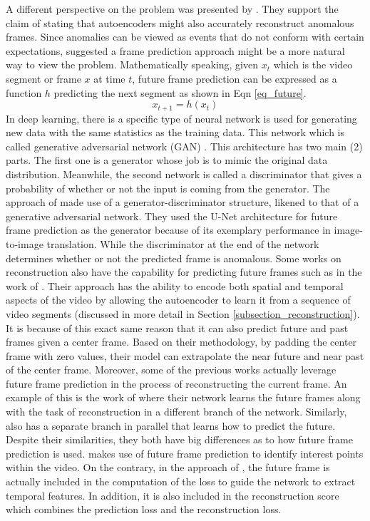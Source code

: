 A different perspective on the problem was presented by . They support the claim of   stating that autoencoders might also accurately reconstruct anomalous frames. Since anomalies can be viewed as events that do not conform with certain expectations,  suggested a frame prediction approach might be a more natural way to view the problem. Mathematically speaking, given $x_t$ which is the video segment or frame $x$ at time $t$, future frame prediction can be expressed as a function $h$ predicting the next segment as shown in Eqn \ref{eq_future}.
\begin{equation}\label{eq_future}
    x_{t+1} = h(x_t)
\end{equation}
In deep learning, there is a specific type of neural network is used for generating new data with the same statistics as the training data. This network which is called generative adversarial network (GAN) . This architecture has two main (2) parts. The first one is a generator whose job is to mimic the original data distribution. Meanwhile, the second network is called a discriminator that gives a probability of whether or not the input is coming from the generator. 
The approach of  made use of a generator-discriminator structure, likened to that of a generative adversarial network. They used the U-Net architecture  for future frame prediction as the generator because of its exemplary performance in image-to-image translation. While the discriminator at the end of the network determines whether or not the predicted frame is anomalous. 
Some works on reconstruction also have the capability for predicting future frames such as in the work of . Their approach has the ability to encode both spatial and temporal aspects of the video by allowing the autoencoder to learn it from a sequence of video segments (discussed in more detail in Section \ref{subsection_reconstruction}). It is because of this exact same reason that it can also predict future and past frames given a center frame. Based on their methodology, by padding the center frame with zero values, their model can extrapolate the near future and near past of the center frame. 
Moreover, some of the previous works actually leverage future frame prediction in the process of reconstructing the current frame. An example of this is the work of   where their network learns the future frames along with the task of reconstruction in a different branch of the network. Similarly,  also has a separate branch in parallel that learns how to predict the future. Despite their similarities, they both have big differences as to how future frame prediction is used.  makes use of future frame prediction to identify interest points within the video. On the contrary, in the approach of  , the future frame is actually included in the computation of the loss to guide the network to extract temporal features. In addition, it is also included in the reconstruction score which combines the prediction loss and the reconstruction loss.

